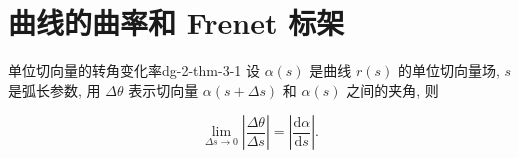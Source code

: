 \section{曲线的曲率和 Frenet 标架}

\begin{theorem}{单位切向量的转角变化率}{dg-2-thm-3-1}
设 \(\alpha(s)\) 是曲线 \(r(s)\) 的单位切向量场, \(s\) 是弧长参数, 用 \(\Delta\theta\) 表示切向量 \(\alpha(s + \Delta s)\) 和 \(\alpha(s)\) 之间的夹角, 则\par

\begin{equation*}
\lim _ {\Delta s \to 0} \left| \frac {\Delta \theta}{\Delta s} \right| = \left| \frac {\mathrm{d} \alpha}{\mathrm{d} s} \right|.
\end{equation*}
\end{theorem}

